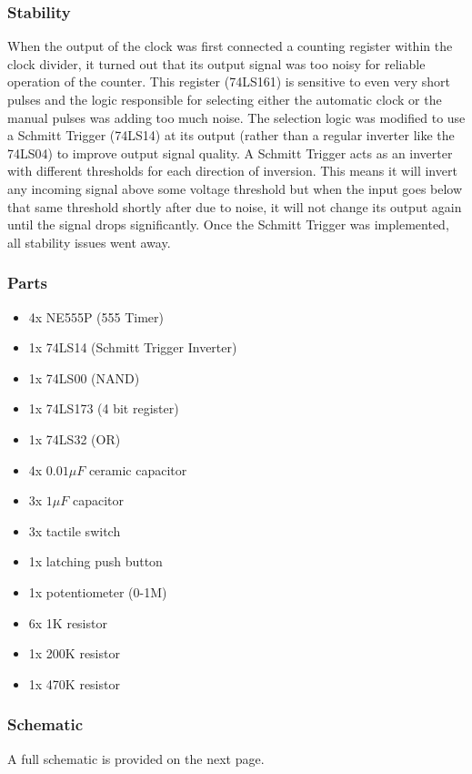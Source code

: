 \subsubsection*{Stability}
When the output of the clock was first connected a counting register within the clock divider, it turned out that its output signal was too noisy for reliable operation of the counter. This register (74LS161) is sensitive to even very short pulses and the logic responsible for selecting either the automatic clock or the manual pulses was adding too much noise. The selection logic was modified to use a Schmitt Trigger (74LS14) at its output (rather than a regular inverter like the 74LS04) to improve output signal quality. A Schmitt Trigger acts as an inverter with different thresholds for each direction of inversion. This means it will invert any incoming signal above some voltage threshold but when the input goes below that same threshold shortly after due to noise, it will not change its output again until the signal drops significantly. Once the Schmitt Trigger was implemented, all stability issues went away.

\subsubsection*{Parts}
\begin{itemize}\itemsep0em
\item 4x NE555P (555 Timer)
\item 1x 74LS14 (Schmitt Trigger Inverter)
\item 1x 74LS00 (NAND)
\item 1x 74LS173 (4 bit register)
\item 1x 74LS32 (OR)
\item 4x $0.01\mu F$ ceramic capacitor
\item 3x $1\mu F$ capacitor
\item 3x tactile switch
\item 1x latching push button
\item 1x potentiometer (0-1M)
\item 6x 1K resistor
\item 1x 200K resistor
\item 1x 470K resistor
\end{itemize}

\subsubsection*{Schematic}
A full schematic is provided on the next page.


